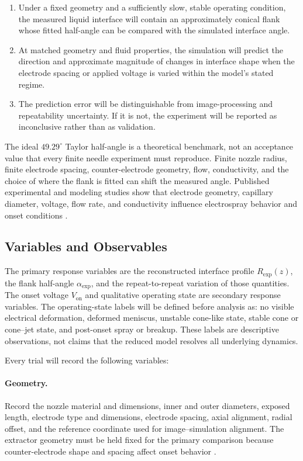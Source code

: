 \begin{enumerate}
    \item Under a fixed geometry and a sufficiently slow, stable operating condition, the measured liquid interface will contain an approximately conical flank whose fitted half-angle can be compared with the simulated interface angle.
    \item At matched geometry and fluid properties, the simulation will predict the direction and approximate magnitude of changes in interface shape when the electrode spacing or applied voltage is varied within the model's stated regime.
    \item The prediction error will be distinguishable from image-processing and repeatability uncertainty. If it is not, the experiment will be reported as inconclusive rather than as validation.
\end{enumerate}

The ideal $49.29^\circ$ Taylor half-angle is a theoretical benchmark, not an acceptance value that every finite needle experiment must reproduce. Finite nozzle radius, finite electrode spacing, counter-electrode geometry, flow, conductivity, and the choice of where the flank is fitted can shift the measured angle. Published experimental and modeling studies show that electrode geometry, capillary diameter, voltage, flow rate, and conductivity influence electrospray behavior and onset conditions \cite{hartman1999electrohydrodynamic,cloupeau1989conejet,cloupeau1994modes}.

\subsection{Variables and Observables}

The primary response variables are the reconstructed interface profile $R_{\mathrm{exp}}(z)$, the flank half-angle $\alpha_{\mathrm{exp}}$, and the repeat-to-repeat variation of those quantities. The onset voltage $V_{\mathrm{on}}$ and qualitative operating state are secondary response variables. The operating-state labels will be defined before analysis as: no visible electrical deformation, deformed meniscus, unstable cone-like state, stable cone or cone--jet state, and post-onset spray or breakup. These labels are descriptive observations, not claims that the reduced model resolves all underlying dynamics.

Every trial will record the following variables:

\paragraph{Geometry.} Record the nozzle material and dimensions, inner and outer diameters, exposed length, electrode type and dimensions, electrode spacing, axial alignment, radial offset, and the reference coordinate used for image--simulation alignment. The extractor geometry must be held fixed for the primary comparison because counter-electrode shape and spacing affect onset behavior \cite{naderi2019curved}.

